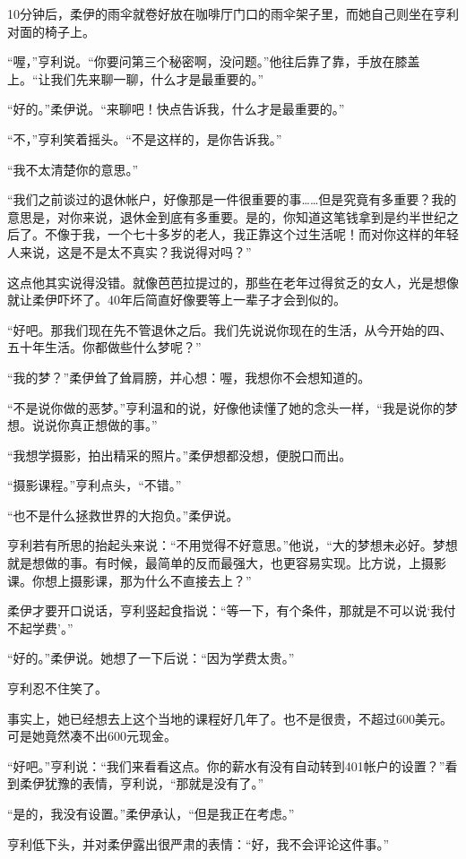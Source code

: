 10分钟后，柔伊的雨伞就卷好放在咖啡厅门口的雨伞架子里，而她自己则坐在亨利对面的椅子上。

“喔，”亨利说。“你要问第三个秘密啊，没问题。”他往后靠了靠，手放在膝盖上。“让我们先来聊一聊，什么才是最重要的。”

“好的。”柔伊说。“来聊吧！快点告诉我，什么才是最重要的。”

“不，”亨利笑着摇头。“不是这样的，是你告诉我。”

“我不太清楚你的意思。”

“我们之前谈过的退休帐户，好像那是一件很重要的事……但是究竟有多重要？我的意思是，对你来说，退休金到底有多重要。是的，你知道这笔钱拿到是约半世纪之后了。不像于我，一个七十多岁的老人，我正靠这个过生活呢！而对你这样的年轻人来说，这是不是太不真实？我说得对吗？”

这点他其实说得没错。就像芭芭拉提过的，那些在老年过得贫乏的女人，光是想像就让柔伊吓坏了。40年后简直好像要等上一辈子才会到似的。

“好吧。那我们现在先不管退休之后。我们先说说你现在的生活，从今开始的四、五十年生活。你都做些什么梦呢？”

“我的梦？”柔伊耸了耸肩膀，并心想：喔，我想你不会想知道的。

“不是说你做的恶梦。”亨利温和的说，好像他读懂了她的念头一样，“我是说你的梦想。说说你真正想做的事。”

“我想学摄影，拍出精采的照片。”柔伊想都没想，便脱口而出。

“摄影课程。”亨利点头，“不错。”

“也不是什么拯救世界的大抱负。”柔伊说。

亨利若有所思的抬起头来说：“不用觉得不好意思。”他说，“大的梦想未必好。梦想就是想做的事。有时候，最简单的反而最强大，也更容易实现。比方说，上摄影课。你想上摄影课，那为什么不直接去上？”

柔伊才要开口说话，亨利竖起食指说：“等一下，有个条件，那就是不可以说‘我付不起学费’。”

“好的。”柔伊说。她想了一下后说：“因为学费太贵。”

亨利忍不住笑了。

事实上，她已经想去上这个当地的课程好几年了。也不是很贵，不超过600美元。可是她竟然凑不出600元现金。

“好吧。”亨利说：“我们来看看这点。你的薪水有没有自动转到401帐户的设置？”看到柔伊犹豫的表情，亨利说，“那就是没有了。”

“是的，我没有设置。”柔伊承认，“但是我正在考虑。”

亨利低下头，并对柔伊露出很严肃的表情：“好，我不会评论这件事。”

